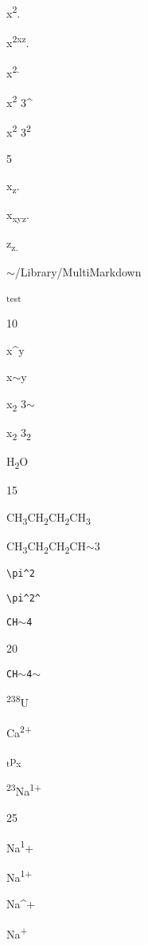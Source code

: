 
\def\mytitle{Superscript}


x\textsuperscript{2}.

x\textsuperscript{2xz}.

x\textsuperscript{2.}

x\textsuperscript{2} 3\^{}

x\textsuperscript{2} 3\textsuperscript{2}

5

x\textsubscript{z}.

x\textsubscript{xyz}.

z\textsubscript{z.}

\ensuremath{\sim}\slash{}Library\slash{}MultiMarkdown

\textsuperscript{test}

10

x\^{}y

x\ensuremath{\sim}y

x\textsubscript{2} 3\ensuremath{\sim}

x\textsubscript{2} 3\textsubscript{2}

H\textsubscript{2}O

15

CH\textsubscript{3}CH\textsubscript{2}CH\textsubscript{2}CH\textsubscript{3}

CH\textsubscript{3}CH\textsubscript{2}CH\textsubscript{2}CH\ensuremath{\sim}3

\texttt{\textbackslash{}pi\^{}2}

\texttt{\textbackslash{}pi\^{}2\^{}}

\texttt{CH\ensuremath{\sim}4}

20

\texttt{CH\ensuremath{\sim}4\ensuremath{\sim}}

\textsuperscript{238}U

Ca\textsuperscript{2+}

\textsubscript{t}p\textsubscript{x}

\textsuperscript{23}Na\textsuperscript{1+}

25

Na\textsuperscript{1}+

Na\textsuperscript{1+}

Na\^{}+

Na\textsuperscript{+}



